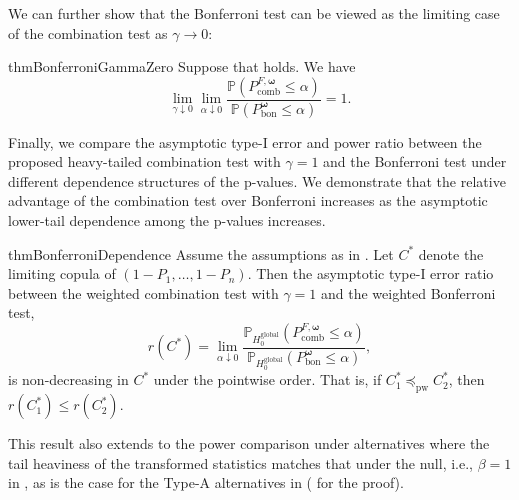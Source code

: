 \documentclass[12pt]{article}
\theoremstyle{plain}
\theoremstyle{plain}
\theoremstyle{definition}
\renewcommand{\Pr}{\mathbb{P}}
\begin{document}
We can further show that the Bonferroni test can be viewed as the limiting case of the combination test as $\gamma \to 0$:
\begin{restatable}{thm}{BonferroniGammaZero}
\label{thm:bonferroni-gamma-zero}
Suppose that  holds.
We have
\begin{equation}
\label{eq:asymp-bonferroni-gamma-zero}
\lim_{\gamma\downarrow0}\lim_{\alpha\downarrow0} \frac{\Pr\left(P_\mathrm{comb}^{F, \bm \omega}\leq \alpha\right)}{\Pr\left(P_{\mathrm{bon}}^{\bm{\omega}}\leq \alpha\right)}
=1.
\end{equation}
\end{restatable}


Finally, we compare the asymptotic type-I error and power ratio between the proposed heavy-tailed combination test with $\gamma = 1$ and the Bonferroni test under different dependence structures of the p-values. We demonstrate that the relative advantage of the combination test over Bonferroni increases as the asymptotic lower-tail dependence among the p-values increases. 

\begin{restatable}{thm}{BonferroniDependence}
\label{thm:bonferroni-more-conservative-with-dependence}
Assume the assumptions as in . Let $C^*$ denote the limiting copula of $(1 - P_1, \dots, 1 - P_n)$. Then the asymptotic type-I error ratio between the weighted combination test with $\gamma = 1$  and the weighted Bonferroni test, 
\begin{equation}
\label{eq:error-increase-vs-dependence}
r(C^*)=\lim_{\alpha\downarrow0}\frac{\Pr_{H_0^\mathrm{global}}\left(P^{F,\bm{\omega}}_\mathrm{comb}\leq \alpha\right)}{\Pr_{H_0^\mathrm{global}}\left(P^{\bm{\omega}}_{\mathrm{bon}}\leq \alpha\right)},
\end{equation}
is non-decreasing in $C^*$ under the pointwise order. That is, if $C_1^*\preceq_{\mathrm{pw}}C_2^*$, then $r(C_1^*)\le r(C_2^*)$.
\end{restatable}

This result also extends to the power comparison under alternatives where the tail heaviness of the transformed statistics matches that under the null, i.e., $\beta = 1$ in ,  as is the case for the Type-A alternatives in  ( for the proof).
\end{document}
